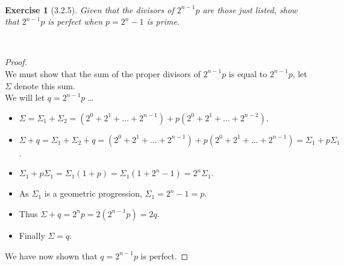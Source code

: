 \documentclass[12pt]{article}
\newcommand{\XB}{\color{black}}
\newcommand{\XBB}{\color{blue}}
\newcommand{\ds}{\displaystyle}
\theoremstyle{plain}
\newtheorem{ex}{Exercise}
\begin{document}
\XBB\hrulefill\XB \\
\begin{ex} [3.2.5]
  Given that the divisors of $ 2^{n - 1}p $ are those just listed, show that $ 2^{n - 1}p $ is perfect when $ p = 2^{n} - 1 $ is prime.
\end{ex}
\XBB\hrulefill\XB \\

\begin{proof}
  \ \\

  We must show that the sum of the proper divisors of $ 2^{n - 1}p $ is equal to $ 2^{n - 1}p $, let $ \Sigma $ denote this sum.\\

  We will let $ q = 2^{n - 1}p $ \dots

  \begin{itemize}
    \item $ \ds \Sigma = \Sigma_{1} + \Sigma_{2} = (2^{0} + 2^{1} + \dots + 2^{n-1}) + p(2^{0} + 2^{1} + \dots + 2^{n-2}) $.
    \item $ \ds \Sigma + q = \Sigma_{1} + \Sigma_{2} + q = (2^{0} + 2^{1} + \dots + 2^{n-1}) + p(2^{0} + 2^{1} + \dots + 2^{n-1}) = \Sigma_{1} + p\Sigma_{1} $.
    \item $ \ds \Sigma_{1} + p\Sigma_{1} = \Sigma_{1}(1 + p) = \Sigma_{1}(1 + 2^{n} - 1) = 2^{n}\Sigma_{1} $.
    \item As $ \Sigma_{1} $ is a geometric progression, $ \Sigma_{1} = 2^{n} - 1 = p $.
    \item Thus $ \Sigma + q = 2^{n}p = 2(2^{n-1}p) = 2q $.
    \item Finally $ \Sigma = q $.
  \end{itemize}

  We have now shown that $ q = 2^{n - 1}p $ is perfect.

\end{proof}
\end{document}
